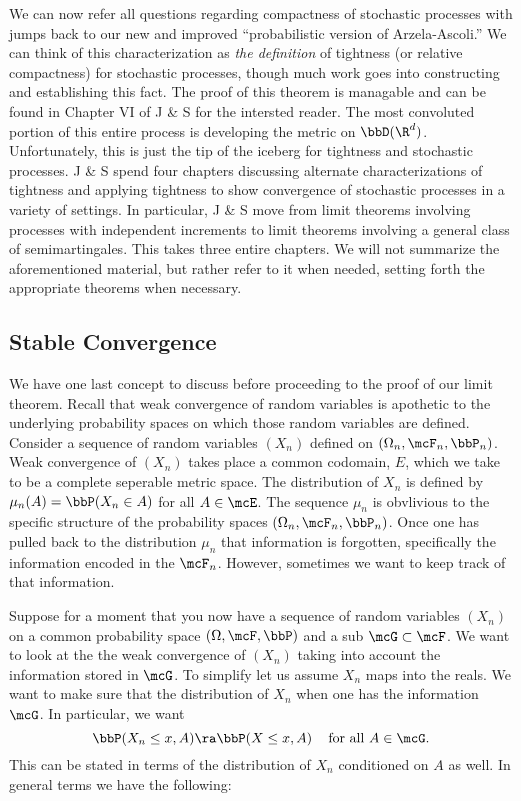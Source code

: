 \documentclass{report}
\begin{document}
We can now refer all questions regarding compactness of stochastic
processes with jumps back to our new and improved ``probabilistic
version of Arzela-Ascoli.''  We can think of this characterization as
\emph{the definition} of tightness (or relative compactness) for
stochastic processes, though much work goes into constructing and
establishing this fact.  The proof of this theorem is managable and
can be found in Chapter VI of J \& S for the intersted reader.  The
most convoluted portion of this entire process is developing the
metric on $\bbD(\R^d)$.  Unfortunately, this is just the tip of the
iceberg for tightness and stochastic processes.  J \& S spend four
chapters discussing alternate characterizations of tightness and
applying tightness to show convergence of stochastic processes in a
variety of settings.  In particular, J \& S move from limit theorems
involving processes with independent increments to limit theorems
involving a general class of semimartingales.  This takes three entire
chapters.  We will not summarize the aforementioned material, but
rather refer to it when needed, setting forth the appropriate theorems
when necessary.

\subsection{Stable Convergence}

We have one last concept to discuss before proceeding to the proof of
our limit theorem.  Recall that weak convergence of random variables
is apothetic to the underlying probability spaces on which those
random variables are defined.  Consider a sequence of random variables
$(X_n)$ defined on $(\Omega_n, \mcF_n, \bbP_n)$.  Weak convergence of
$(X_n)$ takes place a common codomain, $E$, which we take to be a
complete seperable metric space.  The distribution of $X_n$ is defined
by $\mu_n(A) = \bbP(X_n \in A)$ for all $A \in \mcE$.  The sequence
$\mu_n$ is obvlivious to the specific structure of the probability
spaces $(\Omega_n, \mcF_n, \bbP_n)$.  Once one has pulled back to the
distribution $\mu_n$ that information is forgotten, specifically the
information encoded in the \sigalg $\mcF_n$.  However, sometimes we
want to keep track of that information.

Suppose for a moment that you now have a sequence of random variables
$(X_n)$ on a common probability space $(\Omega, \mcF, \bbP)$ and a sub
\sigalg $\mcG \subset \mcF$.  We want to look at the the weak
convergence of $(X_n)$ taking into account the information stored in
$\mcG$.  To simplify let us assume $X_n$ maps into the reals.  We want
to make sure that the distribution of $X_n$ when one has the
information $\mcG$.  In particular, we want
\[
\bbP(X_n \leq x, A) \ra \bbP(X \leq x, A) \;\;\; \textmd{ for all } A
\in \mcG.
\]
This can be stated in terms of the distribution of $X_n$ conditioned
on $A$ as well.  In general terms we have the following:
\end{document}
